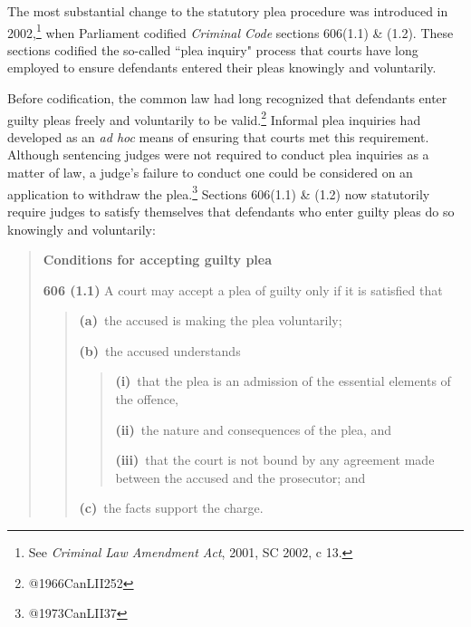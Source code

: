 The most substantial change to the statutory plea procedure was introduced in 2002,\footnote{See \textit{Criminal Law Amendment Act}, 2001, SC 2002, c 13.} when Parliament codified \textit{Criminal Code} sections 606(1.1) \& (1.2). These sections codified the so-called ``plea inquiry" process that courts have long employed to ensure defendants entered their pleas knowingly and voluntarily. 

Before codification, the common law had long recognized that defendants enter guilty pleas freely and voluntarily to be valid.\footnote{@1966CanLII252} Informal plea inquiries had developed as an \textit{ad hoc} means of ensuring that courts met this requirement. Although sentencing judges were not required to conduct plea inquiries as a matter of law, a judge's failure to conduct one could be considered on an application to withdraw the plea.\footnote{@1973CanLII37} Sections 606(1.1) \& (1.2) now statutorily require judges to satisfy themselves that defendants who enter guilty pleas do so knowingly and voluntarily:

\begin{quote}
    \textbf{Conditions for accepting guilty plea}
    
    \textbf{606 (1.1)} A court may accept a plea of guilty only if it is satisfied that

    \begin{quote}
        \textbf{(a)} the accused is making the plea voluntarily;
        
        \textbf{(b)} the accused understands
        \begin{quote}
            \textbf{(i)} that the plea is an admission of the essential elements of the offence,
            
            \textbf{(ii)} the nature and consequences of the plea, and
            
            \textbf{(iii)} that the court is not bound by any agreement made between the accused and the prosecutor; and   
        \end{quote}
        \textbf{(c)} the facts support the charge.
    \end{quote}

\end{quote}

